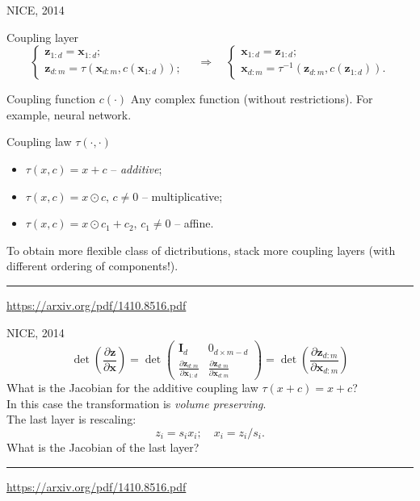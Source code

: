 \documentclass{beamer}
\newcommand{\bx}{\mathbf{x}}
\newcommand{\bz}{\mathbf{z}}
\newcommand{\bI}{\mathbf{I}}
\begin{document}
\begin{frame}{NICE, 2014}
	\begin{block}{Coupling layer}
		\vspace{-0.5cm}
		\begin{equation*}
			\begin{cases} \bz_{1:d} = \bx_{1:d}; \\ \bz_{d:m} = \tau (\bx_{d:m}, c(\bx_{1:d}));\end{cases} 
			\quad \Rightarrow \quad 
			\begin{cases} \bx_{1:d} = \bz_{1:d}; \\ \bx_{d:m} = \tau^{-1} (\bz_{d:m}, c(\bz_{1:d})).\end{cases}
		\end{equation*}
		\vspace{-0.5cm}
	\end{block}
	\begin{block}{Coupling function $c(\cdot)$}
		Any complex function (without restrictions). For example, neural network.
	\end{block}
	\begin{block}{Coupling law $\tau(\cdot, \cdot)$}
		\begin{itemize}
			\item $\tau(x, c) = x + c$ -- \textit{additive};
			\item $\tau(x, c) = x \odot c, \, c \neq 0$ -- multiplicative;
			\item $\tau(x, c) = x \odot c_1 + c_2, \, c_1 \neq 0$ -- affine.
		\end{itemize}
	\end{block}
	To obtain more flexible class of dictributions, stack more coupling layers (with different ordering of components!). \\
	\vfill
	\hrule\medskip
	{\scriptsize \href{https://arxiv.org/pdf/1410.8516.pdf}{https://arxiv.org/pdf/1410.8516.pdf}} 
\end{frame}
\begin{frame}{NICE, 2014}
	\[
	\det \left( \frac{\partial \bz}{\partial \bx} \right) = \det 
	\begin{pmatrix}
		\bI_d & 0_{d \times m - d} \\
		\frac{\partial \bz_{d:m}}{\partial \bx_{1:d}} & \frac{\partial \bz_{d:m}}{\partial \bx_{d:m}}
	\end{pmatrix} = 
	\det \left( \frac{\partial \bz_{d:m}}{\partial \bx_{d:m}} \right)
	\]
	What is the Jacobian for the additive coupling law $\tau(x + c) = x + c$? \\
	In this case the transformation is \textit{volume preserving}. \\
	The last layer is rescaling:
	\[
	z_i = s_i x_i; \quad x_i = z_i / s_i.
	\]
	What is the Jacobian of the last layer?
	\vfill
	\hrule\medskip
	{\scriptsize \href{https://arxiv.org/pdf/1410.8516.pdf}{https://arxiv.org/pdf/1410.8516.pdf}} 
\end{frame}
\end{document}
